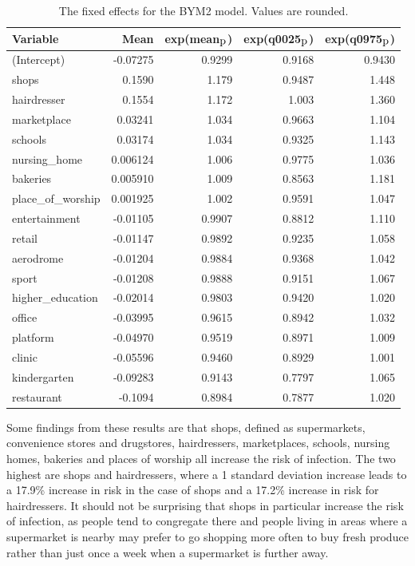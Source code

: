 \begin{table}[H] 
\caption{The fixed effects for the BYM2 model. Values are rounded. \label{fixedInfraGermany}}
\begin{tabular}{l r r r r}
\toprule
\textbf{Variable}	& \textbf{Mean}	& \textbf{exp(mean$_{\hbox{p}}$)} & \textbf{exp(q0025$_{\hbox{p}}$)} & \textbf{exp(q0975$_{\hbox{p}}$)} \\
\midrule
(Intercept) & -0.07275 & 0.9299 & 0.9168 & 0.9430 \\
shops & 0.1590 & 1.179 & 0.9487 & 1.448 \\
hairdresser & 0.1554 & 1.172 & 1.003 & 1.360 \\
marketplace & 0.03241 & 1.034 & 0.9663 & 1.104 \\
schools & 0.03174 & 1.034 & 0.9325 & 1.143 \\
nursing\_home & 0.006124 & 1.006 & 0.9775 & 1.036 \\
bakeries & 0.005910 & 1.009 & 0.8563 & 1.181 \\
place\_of\_worship & 0.001925 & 1.002 & 0.9591 & 1.047 \\
entertainment & -0.01105 & 0.9907 & 0.8812 & 1.110 \\
retail & -0.01147 & 0.9892 & 0.9235 & 1.058 \\
aerodrome & -0.01204 & 0.9884 & 0.9368 & 1.042 \\
sport & -0.01208 & 0.9888 & 0.9151 & 1.067 \\
higher\_education & -0.02014 & 0.9803 & 0.9420 & 1.020 \\
office & -0.03995 & 0.9615 & 0.8942 & 1.032 \\
platform & -0.04970 & 0.9519 & 0.8971 & 1.009 \\
clinic & -0.05596 & 0.9460 & 0.8929 & 1.001 \\
kindergarten & -0.09283 & 0.9143 & 0.7797 & 1.065 \\
restaurant & -0.1094 & 0.8984 & 0.7877 & 1.020 \\
\bottomrule
\end{tabular}
\end{table}
Some findings from these results are that shops, defined as supermarkets, convenience stores and drugstores, hairdressers, marketplaces, schools, nursing homes, bakeries and places of worship all increase the risk of infection. The two highest are shops and hairdressers, where a 1 standard deviation increase leads to a 17.9\% increase in risk in the case of shops and a 17.2\% increase in risk for hairdressers. It should not be surprising that shops in particular increase the risk of infection, as people tend to congregate there and people living in areas where a supermarket is nearby may prefer to go shopping more often to buy fresh produce rather than just once a week when a supermarket is further away. \\
